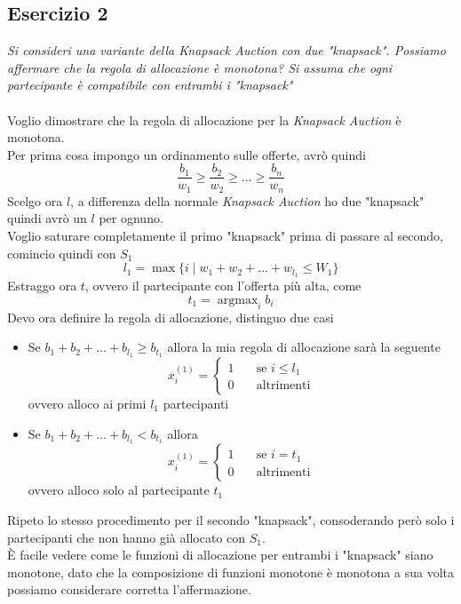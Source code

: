 \documentclass{article}
\DeclareMathOperator*{\argmax}{argmax}
\begin{document}
        \subsection{Esercizio 2}
            \textit{Si consideri una variante della Knapsack Auction con due "knapsack". Possiamo affermare che la regola di allocazione è monotona? Si assuma che ogni partecipante è compatibile con entrambi i "knapsack"}\\
            \\
            Voglio dimostrare che la regola di allocazione per la \textit{Knapsack Auction} è monotona.\\
            Per prima cosa impongo un ordinamento sulle offerte, avrò quindi
            \[
                \frac{b_1}{w_1} \geq \frac{b_2}{w_2} \geq \dots \geq \frac{b_n}{w_n}    
            \]
            Scelgo ora $ l $, a differenza della normale \textit{Knapsack Auction} ho due "knapsack" quindi avrò un $ l $ per ognuno.\\
            Voglio saturare completamente il primo "knapsack" prima di passare al secondo, comincio quindi con $ S_1 $
            \[
                l_1 = \max\{ i\; \vert\; w_1 + w_2 + \dots + w_{l_1} \leq W_1 \}    
            \]
            Estraggo ora $ t $, ovvero il partecipante con l'offerta più alta, come
            \[
                t_1 = \argmax_i b_i    
            \]
            Devo ora definire la regola di allocazione, distinguo due casi
            \begin{itemize}
                \item Se $ b_1 + b_2 + \dots + b_{l_1} \geq b_{t_1} $ allora la mia regola di allocazione sarà la seguente
                      \[
                        x_i^{(1)} = \begin{cases}
                            1\quad &\text{se } i \leq l_1\\
                            0\quad &\text{altrimenti}
                        \end{cases}    
                      \]
                      ovvero alloco ai primi $ l_1 $ partecipanti
                \item Se $ b_1 + b_2 + \dots + b_{l_1} < b_{t_1} $ allora
                      \[
                        x_i^{(1)} = \begin{cases}
                            1\quad &\text{se } i = t_1\\
                            0\quad &\text{altrimenti}
                        \end{cases}
                      \] ovvero alloco solo al partecipante $ t_1 $
            \end{itemize}
            Ripeto lo stesso procedimento per il secondo "knapsack", consoderando però solo i partecipanti che non hanno già allocato con $ S_1 $.\\
            È facile vedere come le funzioni di allocazione per entrambi i "knapsack" siano monotone, dato che la composizione di funzioni monotone è monotona a sua volta possiamo considerare corretta l'affermazione.
        \newpage
\end{document}
